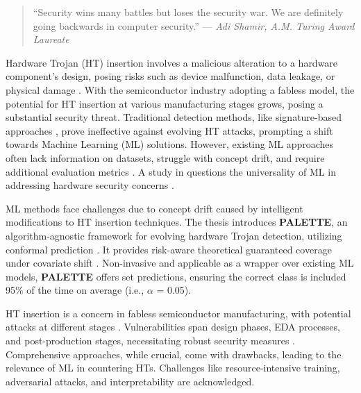 \begingroup
\RaggedRight

\begin{quote}
``Security wins many battles but loses the security war. We are definitely going backwards in computer security.''
\newline
\hfill  — \textit{Adi Shamir, A.M. Turing Award Laureate}
\end{quote}


Hardware Trojan (HT) insertion involves a malicious alteration to a hardware component's design, posing risks such as device malfunction, data leakage, or physical damage \cite{francq2015introduction}. With the semiconductor industry adopting a fabless model, the potential for HT insertion at various manufacturing stages grows, posing a substantial security threat. Traditional detection methods, like signature-based approaches \cite{gbade2014signature}, prove ineffective against evolving HT attacks, prompting a shift towards Machine Learning (ML) solutions. However, existing ML approaches often lack information on datasets, struggle with concept drift, and require additional evaluation metrics \cite{285613}. A study in \cite{quiring2022and} questions the universality of ML in addressing hardware security concerns \cite{liu2021two}.

ML methods face challenges due to concept drift caused by intelligent modifications to HT insertion techniques. The thesis introduces \textbf{PALETTE}, an algorithm-agnostic framework for evolving hardware Trojan detection, utilizing conformal prediction \cite{shafer2008tutorial}. It provides risk-aware theoretical guaranteed coverage under covariate shift \cite{tibshirani2019conformal}. Non-invasive and applicable as a wrapper over existing ML models, \textbf{PALETTE} offers set predictions, ensuring the correct class is included 95\% of the time on average (i.e., $\alpha$ = 0.05).

HT insertion is a concern in fabless semiconductor manufacturing, with potential attacks at different stages \cite{salmani2017hardware, Regazzoni:HTDetection, Guin:HTDetection, Salmani:HTDetection}. Vulnerabilities span design phases, EDA processes, and post-production stages, necessitating robust security measures \cite{narasimhan2011tesr, muralidhar2021contrastive, chang2023supplier, panduro2023effective, monjur2023hardware}. Comprehensive approaches, while crucial, come with drawbacks, leading to the relevance of ML in countering HTs. Challenges like resource-intensive training, adversarial attacks, and interpretability are acknowledged.

